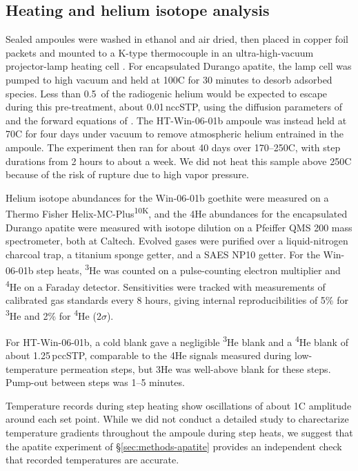 \subsection{Heating and helium isotope analysis}\label{sec:methods-analysis}

Sealed ampoules were washed in ethanol and air dried, then placed in copper foil packets and mounted to a K-type thermocouple in an ultra-high-vacuum projector-lamp heating cell \citep{farley1999}. For encapsulated Durango apatite, the lamp cell was pumped to high vacuum and held at 100\textdegree C for 30 minutes to desorb adsorbed species. Less than 0.5\,\textperthousand{} of the radiogenic helium would be expected to escape during this pre-treatment, about 0.01\,nccSTP, using the diffusion parameters of \citet{farley2000} and the forward equations of \citet{fechtigkalbitzer1966}. The HT-Win-06-01b ampoule was instead held at 70\textdegree C for four days under vacuum to remove atmospheric helium entrained in the ampoule. The experiment then ran for about 40 days over 170--250\textdegree C, with step durations from 2 hours to about a week. We did not heat this sample above 250\textdegree C because of the risk of rupture due to high vapor pressure.

Helium isotope abundances for the Win-06-01b goethite were measured on a Thermo Fisher Helix-MC-Plus\textsuperscript{10K}, and the 4He abundances for the encapsulated Durango apatite were measured with isotope dilution on a Pfeiffer QMS 200 mass spectrometer, both at Caltech. Evolved gases were purified over a liquid-nitrogen charcoal trap, a titanium sponge getter, and a SAES NP10 getter. For the Win-06-01b step heats, \textsuperscript{3}He was counted on a pulse-counting electron multiplier and \textsuperscript{4}He on a Faraday detector. Sensitivities were tracked with measurements of calibrated gas standards every 8 hours, giving internal reproducibilities of 5\% for \textsuperscript{3}He and 2\% for \textsuperscript{4}He (2$\sigma$).

For HT-Win-06-01b, a cold blank gave a negligible \textsuperscript{3}He blank and a \textsuperscript{4}He blank of about 1.25\,pccSTP, comparable to the 4He signals measured during low-temperature permeation steps, but 3He was well-above blank for these steps. Pump-out between steps was 1--5 minutes. 

Temperature records during step heating show oscillations of about 1\textdegree C amplitude around each set point. While we did not conduct a detailed study to charectarize temperature gradients throughout the ampoule during step heats, we suggest that the apatite experiment of \S\ref{sec:methods-apatite} provides an independent check that recorded temperatures are accurate. 

